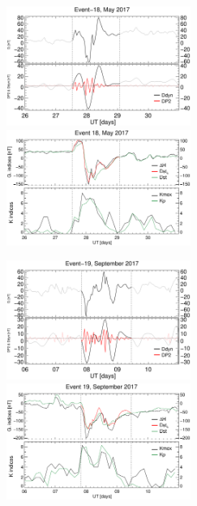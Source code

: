\documentclass[a4paper,fleqn]{cas-dc}
\begin{document}
\begin{figure}[h!]
     \centerline{\Large \bf   
      \hspace{0.275\textwidth}  \color{black}{}
       \hspace{0.295\textwidth}  \color{black}{}
         \hfill}
    \includegraphics[width=6.0cm]{images/diono/iono_PI_V1_2017-05-26.eps}
    \includegraphics[width=6.0cm]{images/dH_approx/diono_valid_V4_2017-05-26.eps}

       \centerline{\Large \bf   
      \hspace{0.275\textwidth}  \color{black}{}
       \hspace{0.295\textwidth}  \color{black}{}
         \hfill}
    \includegraphics[width=6.0cm]{images/diono/iono_PI_V1_2017-09-06.eps}  
 	\includegraphics[width=6.0cm]{images/dH_approx/diono_valid_V4_2017-09-06.eps}    


\end{figure}
\end{document}
